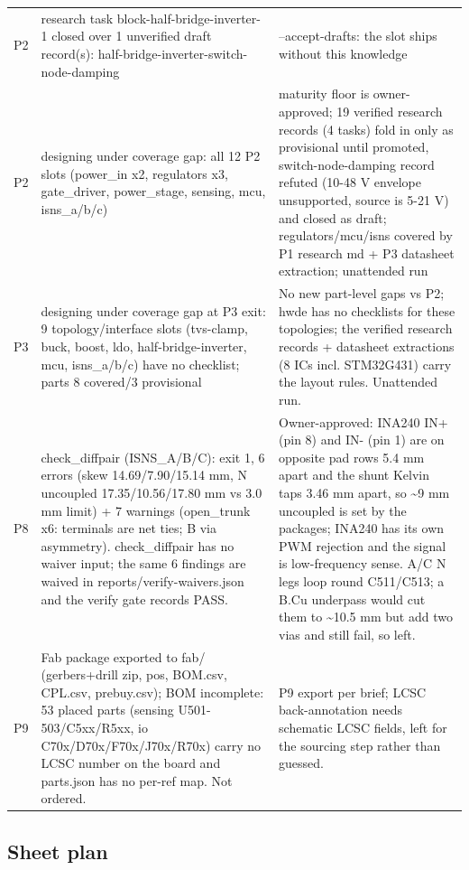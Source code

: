 \documentclass[11pt,a4paper]{article}
\begin{document}
{\begin{longtable}{lp{5.2cm}p{7.2cm}}
P2 & research task block-half-bridge-inverter-1 closed over 1 unverified draft record(s): half-bridge-inverter-switch-node-damping & --accept-drafts: the slot ships without this knowledge \\
P2 & designing under coverage gap: all 12 P2 slots (power\_in x2, regulators x3, gate\_driver, power\_stage, sensing, mcu, isns\_a/b/c) & maturity floor is owner-approved; 19 verified research records (4 tasks) fold in only as provisional until promoted, switch-node-damping record refuted (10-48 V envelope unsupported, source is 5-21 V) and closed as draft; regulators/mcu/isns covered by P1 research md + P3 datasheet extraction; unattended run \\
P3 & designing under coverage gap at P3 exit: 9 topology/interface slots (tvs-clamp, buck, boost, ldo, half-bridge-inverter, mcu, isns\_a/b/c) have no checklist; parts 8 covered/3 provisional & No new part-level gaps vs P2; hwde has no checklists for these topologies; the verified research records + datasheet extractions (8 ICs incl. STM32G431) carry the layout rules. Unattended run. \\
P8 & check\_diffpair (ISNS\_A/B/C): exit 1, 6 errors (skew 14.69/7.90/15.14 mm, N uncoupled 17.35/10.56/17.80 mm vs 3.0 mm limit) + 7 warnings (open\_trunk x6: terminals are net ties; B via asymmetry). check\_diffpair has no waiver input; the same 6 findings are waived in reports/verify-waivers.json and the verify gate records PASS. & Owner-approved: INA240 IN+ (pin 8) and IN- (pin 1) are on opposite pad rows 5.4 mm apart and the shunt Kelvin taps 3.46 mm apart, so \textasciitilde{}9 mm uncoupled is set by the packages; INA240 has its own PWM rejection and the signal is low-frequency sense. A/C N legs loop round C511/C513; a B.Cu underpass would cut them to \textasciitilde{}10.5 mm but add two vias and still fail, so left. \\
P9 & Fab package exported to fab/ (gerbers+drill zip, pos, BOM.csv, CPL.csv, prebuy.csv); BOM incomplete: 53 placed parts (sensing U501-503/C5xx/R5xx, io C70x/D70x/F70x/J70x/R70x) carry no LCSC number on the board and parts.json has no per-ref map. Not ordered. & P9 export per brief; LCSC back-annotation needs schematic LCSC fields, left for the sourcing step rather than guessed. \\
\bottomrule
\end{longtable}
}
\subsection*{Sheet plan}
\end{document}
